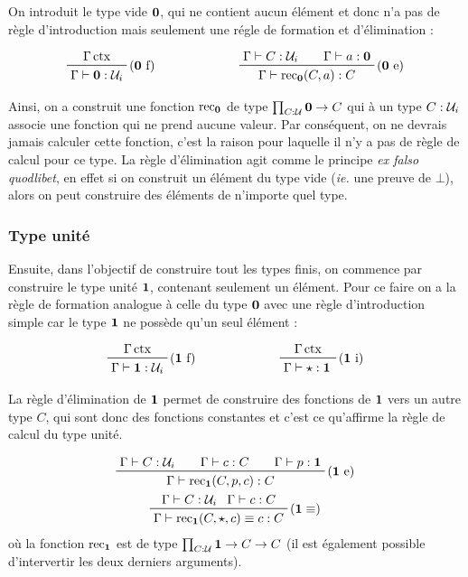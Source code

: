 \documentclass[../../rapport.tex]{subfiles}
\begin{document}
  On introduit le type vide $\operatorname{\textbf{0}}$, qui ne contient aucun élément et donc n'a pas de règle d'introduction mais seulement
  une régle de formation et d'élimination :

  $$
  \prfinterspace=2em
  \begin{array}{cc}
    \prftree[r]{($\0$ f)}{\Gamma \ctx}{\Gamma \vdash \0 : \U_i} \hspace{2cm}
    & \prftree[r]{($\0$ e)}{\Gamma \vdash C : \U_i}{\Gamma \vdash a : \0}{\Gamma \vdash \rec_{\0}(C, a) : C}
  \end{array}
  $$

  Ainsi, on a construit une fonction $\operatorname{rec}_{\operatorname{\textbf{0}}}$ de type $\prod_{C: \mathcal U} \operatorname{\textbf{0}} \rightarrow C$
  qui à un type $C : \mathcal U_i$ associe une fonction qui ne prend aucune valeur.
  Par conséquent, on ne devrais jamais calculer cette fonction,
  c'est la raison pour laquelle il n'y a pas de règle de calcul pour ce type.
  La règle d'élimination agit comme le principe \textit{ex falso quodlibet},
  en effet si on construit un élément du type vide (\textit{ie.} une preuve de $\bot$),
  alors on peut construire des éléments de n'importe quel type.

  \subsubsection{Type unité}

  Ensuite, dans l'objectif de construire tout les types finis, on commence par construire le type unité $\operatorname{\textbf{1}}$,
  contenant seulement un élément. Pour ce faire on a la règle de formation analogue à celle du type $\operatorname{\textbf{0}}$ avec
  une règle d'introduction simple car le type $\operatorname{\textbf{1}}$ ne possède qu'un seul élément :

  $$
  \prfinterspace=2em
  \begin{array}{cc}
    \prftree[r]{($\1$ f)}{\Gamma \ctx}{\Gamma \vdash \1 : \U_i} \hspace{2cm}
    & \prftree[r]{($\1$ i)}{\Gamma \ctx}{\Gamma \vdash \star : \1}
  \end{array}
  $$

  La règle d'élimination de $\operatorname{\textbf{1}}$ permet de construire des fonctions de $\operatorname{\textbf{1}}$ vers un autre type $C$,
  qui sont donc des fonctions constantes et c'est ce qu'affirme la règle de calcul du type unité.

  \begin{gather*}
    \prfinterspace=2em
    \prftree[r]{($\1$ e)}{\Gamma \vdash C : \U_i}{\Gamma \vdash c : C}{\Gamma \vdash p : \1}
      {\Gamma \vdash \rec_{\1}(C, p, c) : C} \\
    \prftree[r]{($\1 \equiv$)}{\Gamma \vdash C : \U_i}{\Gamma \vdash c : C}
      {\Gamma \vdash \rec_{\1}(C, \star, c) \equiv c : C}
  \end{gather*}
  où la fonction $\operatorname{rec}_{\operatorname{\textbf{1}}}$ est de type $\prod_{C : \mathcal U}\operatorname{\textbf{1}} \rightarrow C \rightarrow C$
  (il est également possible d'intervertir les deux derniers arguments).
\end{document}
